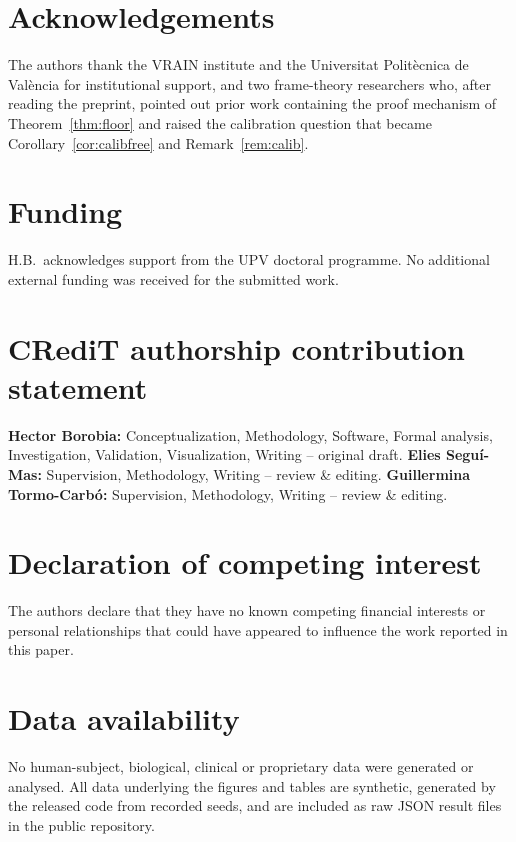 %   

\section*{Acknowledgements}
The authors thank the VRAIN institute and the Universitat Polit\`ecnica de Val\`encia for
institutional support, and two frame-theory researchers who, after reading the preprint,
pointed out prior work containing the proof mechanism of Theorem~\ref{thm:floor} and raised the
calibration question that became Corollary~\ref{cor:calibfree} and Remark~\ref{rem:calib}.

\section*{Funding}
H.B.\ acknowledges support from the UPV doctoral programme. No additional external funding was
received for the submitted work.

\section*{CRediT authorship contribution statement}
\textbf{Hector Borobia:} Conceptualization, Methodology, Software, Formal analysis,
Investigation, Validation, Visualization, Writing -- original draft.
\textbf{Elies Segu\'i-Mas:} Supervision, Methodology, Writing -- review \& editing.
\textbf{Guillermina Tormo-Carb\'o:} Supervision, Methodology, Writing -- review \& editing.

\section*{Declaration of competing interest}
The authors declare that they have no known competing financial interests or personal
relationships that could have appeared to influence the work reported in this paper.

\section*{Data availability}
No human-subject, biological, clinical or proprietary data were generated or analysed. All
data underlying the figures and tables are synthetic, generated by the released code from
recorded seeds, and are included as raw JSON result files in the public repository.

